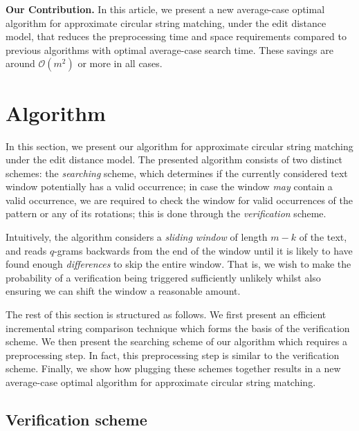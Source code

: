\documentclass[runningheads, envcountsame, a4paper]{llncs}\usepackage{etex}
\newcommand{\cO}{\mathcal{O}}
\begin{document}
\textbf{Our Contribution.} 
In this article, we present a new average-case optimal algorithm for approximate circular string matching, under the edit distance model, that reduces 
the preprocessing time and space requirements compared to previous algorithms with optimal average-case search time. These savings are around $\cO(m^2)$ or more in all cases.
\section{Algorithm}
\label{sec:algo}
In this section, we present our algorithm for approximate circular string matching under the edit distance model. 
The presented algorithm consists of two distinct schemes: the {\em searching} scheme, which determines if the currently considered text window potentially has a valid occurrence; in case the window \textit{may} contain a valid occurrence, we are required to check the window for valid occurrences of the pattern or any of its rotations; this is done through the {\em verification} scheme.

Intuitively, the algorithm considers a {\em sliding window} of length $m-k$ of the text, and reads $q$-grams backwards from the end of the window until it is likely to have found enough {\em differences} to skip the entire window. That is, we wish to make the probability of a verification being triggered sufficiently unlikely whilst also ensuring we can shift the window a reasonable amount.

The rest of this section is structured as follows. We first present an efficient incremental string comparison technique which forms the basis of the verification scheme. 
We then present the searching scheme of our algorithm which requires a preprocessing step. In fact, this preprocessing step is similar to the verification scheme. Finally, we show how plugging these schemes together results in a new average-case optimal algorithm for approximate circular string matching.

\subsection{Verification scheme}
\end{document}

